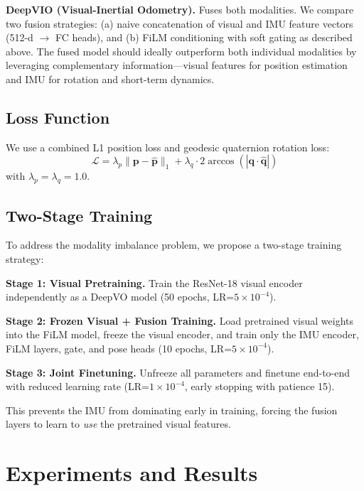 \documentclass[conference]{IEEEtran}
\begin{document}
\textbf{DeepVIO (Visual-Inertial Odometry).} Fuses both modalities. We compare two fusion strategies: (a) naive concatenation of visual and IMU feature vectors (512-d $\to$ FC heads), and (b) FiLM conditioning with soft gating as described above. The fused model should ideally outperform both individual modalities by leveraging complementary information---visual features for position estimation and IMU for rotation and short-term dynamics.

\subsection{Loss Function}

We use a combined L1 position loss and geodesic quaternion rotation loss:
\begin{equation}
    \mathcal{L} = \lambda_p \|\mathbf{p} - \hat{\mathbf{p}}\|_1 + \lambda_q \cdot 2\arccos(|\mathbf{q} \cdot \hat{\mathbf{q}}|)
\end{equation}
with $\lambda_p = \lambda_q = 1.0$.

\subsection{Two-Stage Training}

To address the modality imbalance problem, we propose a two-stage training strategy:

\textbf{Stage 1: Visual Pretraining.} Train the ResNet-18 visual encoder independently as a DeepVO model (50 epochs, LR=$5 \times 10^{-4}$).

\textbf{Stage 2: Frozen Visual + Fusion Training.} Load pretrained visual weights into the FiLM model, freeze the visual encoder, and train only the IMU encoder, FiLM layers, gate, and pose heads (10 epochs, LR=$5 \times 10^{-4}$).

\textbf{Stage 3: Joint Finetuning.} Unfreeze all parameters and finetune end-to-end with reduced learning rate (LR=$1 \times 10^{-4}$, early stopping with patience 15).

This prevents the IMU from dominating early in training, forcing the fusion layers to learn to \textit{use} the pretrained visual features.

\section{Experiments and Results}
\end{document}
